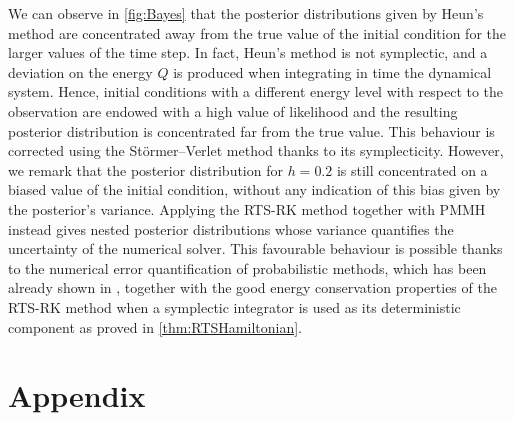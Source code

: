 \documentclass[10pt]{article}
\begin{document}
We can observe in \cref{fig:Bayes} that the posterior distributions given by Heun's method are concentrated away from the true value of the initial condition for the larger values of the time step. In fact, Heun's method is not symplectic, and a deviation on the energy $Q$ is produced when integrating in time the dynamical system. Hence, initial conditions with a different energy level with respect to the observation are endowed with a high value of likelihood and the resulting posterior distribution is concentrated far from the true value. This behaviour is corrected using the Störmer--Verlet method thanks to its symplecticity. However, we remark that the posterior distribution for $h = 0.2$ is still concentrated on a biased value of the initial condition, without any indication of this bias given by the posterior's variance. Applying the RTS-RK method together with PMMH instead gives nested posterior distributions whose variance quantifies the uncertainty of the numerical solver. This favourable behaviour is possible thanks to the numerical error quantification of probabilistic methods, which has been already shown in \cite{CGS16, COS17}, together with the good energy conservation properties of the RTS-RK method when a symplectic integrator is used as its deterministic component as proved in \cref{thm:RTSHamiltonian}.

\section*{Appendix}

\end{document}
